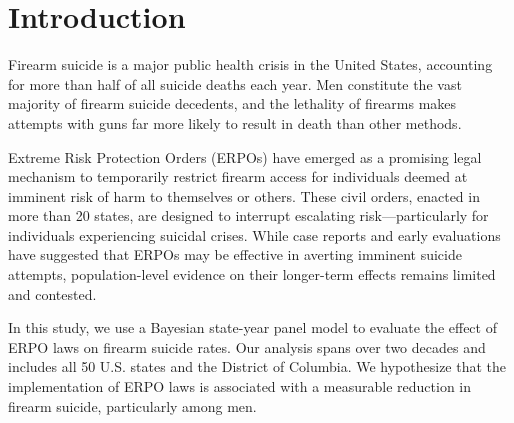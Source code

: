 \documentclass[,ijds,nonblindrev]{informs}
\begin{document}

\maketitle


\section{Introduction}\label{introduction}

Firearm suicide is a major public health crisis in the United States,
accounting for more than half of all suicide deaths each year. Men
constitute the vast majority of firearm suicide decedents, and the
lethality of firearms makes attempts with guns far more likely to result
in death than other methods.

Extreme Risk Protection Orders (ERPOs) have emerged as a promising legal
mechanism to temporarily restrict firearm access for individuals deemed
at imminent risk of harm to themselves or others. These civil orders,
enacted in more than 20 states, are designed to interrupt escalating
risk---particularly for individuals experiencing suicidal crises. While
case reports and early evaluations have suggested that ERPOs may be
effective in averting imminent suicide attempts, population-level
evidence on their longer-term effects remains limited and contested.

In this study, we use a Bayesian state-year panel model to evaluate the
effect of ERPO laws on firearm suicide rates. Our analysis spans over
two decades and includes all 50 U.S. states and the District of
Columbia. We hypothesize that the implementation of ERPO laws is
associated with a measurable reduction in firearm suicide, particularly
among men.
\end{document}
